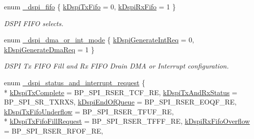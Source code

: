 \begin{DoxyCompactItemize}
\item 
enum \hyperlink{group__dspi__hal_gae3f607745b9b2fa245188acbe25877f0}{\+\_\+dspi\+\_\+fifo} \{ \hyperlink{group__dspi__hal_ggae3f607745b9b2fa245188acbe25877f0a1bc4ddf8090ce2f77222df8b019b77de}{k\+Dspi\+Tx\+Fifo} = 0, 
\hyperlink{group__dspi__hal_ggae3f607745b9b2fa245188acbe25877f0a17a12e128e1f01f8024a4de10e7e09d5}{k\+Dspi\+Rx\+Fifo} = 1
 \}\begin{DoxyCompactList}\small\item\em D\+S\+PI F\+I\+FO selects. \end{DoxyCompactList}
\item 
enum \hyperlink{group__dspi__hal_gabf58af9938cec54ac95d73644f41e5f4}{\+\_\+dspi\+\_\+dma\+\_\+or\+\_\+int\+\_\+mode} \{ \hyperlink{group__dspi__hal_ggabf58af9938cec54ac95d73644f41e5f4ae6f189b379c53dc2ddc1ac1b509dae9e}{k\+Dspi\+Generate\+Int\+Req} = 0, 
\hyperlink{group__dspi__hal_ggabf58af9938cec54ac95d73644f41e5f4a3bb79d3c56c6110432d38dddef054344}{k\+Dspi\+Generate\+Dma\+Req} = 1
 \}\begin{DoxyCompactList}\small\item\em D\+S\+PI Tx F\+I\+FO Fill and Rx F\+I\+FO Drain D\+MA or Interrupt configuration. \end{DoxyCompactList}
\item 
enum \hyperlink{group__dspi__hal_ga4ceea9e434ef062f9d1a9f34520143a3}{\+\_\+dspi\+\_\+status\+\_\+and\+\_\+interrupt\+\_\+request} \{ \\*
\hyperlink{group__dspi__hal_gga4ceea9e434ef062f9d1a9f34520143a3a1250abd2c9532ec9024d4e4589b15c4e}{k\+Dspi\+Tx\+Complete} = B\+P\+\_\+\+S\+P\+I\+\_\+\+R\+S\+E\+R\+\_\+\+T\+C\+F\+\_\+\+RE, 
\hyperlink{group__dspi__hal_gga4ceea9e434ef062f9d1a9f34520143a3a76ae26ce982dc760f34d43ef77aff4df}{k\+Dspi\+Tx\+And\+Rx\+Status} = B\+P\+\_\+\+S\+P\+I\+\_\+\+S\+R\+\_\+\+T\+X\+R\+XS, 
\hyperlink{group__dspi__hal_gga4ceea9e434ef062f9d1a9f34520143a3ae26e3bb587466c7075af063a5a342b68}{k\+Dspi\+End\+Of\+Queue} = B\+P\+\_\+\+S\+P\+I\+\_\+\+R\+S\+E\+R\+\_\+\+E\+O\+Q\+F\+\_\+\+RE, 
\hyperlink{group__dspi__hal_gga4ceea9e434ef062f9d1a9f34520143a3a9e1094f02be24573437b71f3c64a78cd}{k\+Dspi\+Tx\+Fifo\+Underflow} = B\+P\+\_\+\+S\+P\+I\+\_\+\+R\+S\+E\+R\+\_\+\+T\+F\+U\+F\+\_\+\+RE, 
\\*
\hyperlink{group__dspi__hal_gga4ceea9e434ef062f9d1a9f34520143a3ac47470dc6b1cd08d73107f4aedb1ffb0}{k\+Dspi\+Tx\+Fifo\+Fill\+Request} = B\+P\+\_\+\+S\+P\+I\+\_\+\+R\+S\+E\+R\+\_\+\+T\+F\+F\+F\+\_\+\+RE, 
\hyperlink{group__dspi__hal_gga4ceea9e434ef062f9d1a9f34520143a3add17f34827e8e5921d4c121569534239}{k\+Dspi\+Rx\+Fifo\+Overflow} = B\+P\+\_\+\+S\+P\+I\+\_\+\+R\+S\+E\+R\+\_\+\+R\+F\+O\+F\+\_\+\+RE, 

\end{DoxyCompactItemize}
